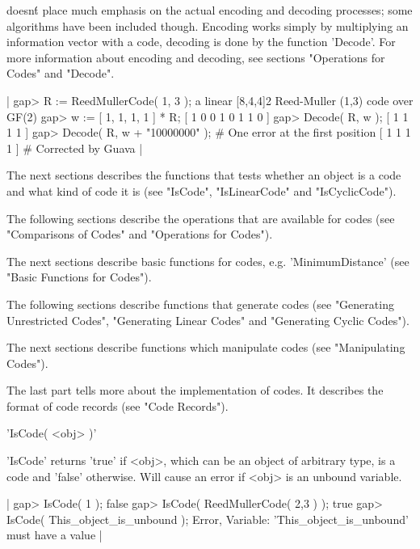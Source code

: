 {\GUAVA} doesn\'t place much emphasis on the actual encoding and decoding
processes;  some  algorithms have  been  included  though. Encoding works
simply by multiplying an information vector with a code, decoding is done
by  the   function 'Decode'. For   more  information  about  encoding and
decoding, see sections "Operations for Codes" and "Decode".

|    gap> R := ReedMullerCode( 1, 3 );
    a linear [8,4,4]2 Reed-Muller (1,3) code over GF(2)
    gap> w := [ 1, 1, 1, 1 ] * R;
    [ 1 0 0 1 0 1 1 0 ]
    gap> Decode( R, w );
    [ 1 1 1 1 ]
    gap> Decode( R, w + "10000000" ); # One error at the first position
    [ 1 1 1 1 ]                       # Corrected by Guava |

The next sections describes the functions that tests whether an object is
a code  and  what kind  of code  it is (see  "IsCode", "IsLinearCode" and
"IsCyclicCode").

The  following sections describe the   operations that are available  for
codes (see "Comparisons of Codes" and "Operations for Codes").

The   next  sections     describe    basic   functions    for     codes,
e.g. 'MinimumDistance' (see "Basic Functions for Codes").

The following  sections   describe functions  that  generate  codes  (see
"Generating    Unrestricted   Codes",  "Generating   Linear   Codes"  and
"Generating Cyclic Codes").

The  next sections  describe    functions which  manipulate   codes  (see
"Manipulating Codes").

The last part tells more about the implementation  of codes. It describes
the format of code records (see "Code Records").


'IsCode( <obj> )'

'IsCode' returns 'true'  if <obj>, which  can  be an object  of arbitrary
type, is a code and 'false' otherwise. Will cause an error if <obj> is an
unbound variable.

|    gap> IsCode( 1 );
    false
    gap> IsCode( ReedMullerCode( 2,3 ) );
    true
    gap> IsCode( This_object_is_unbound );
    Error, Variable: 'This_object_is_unbound' must have a value |


